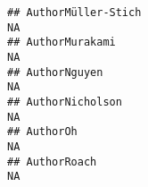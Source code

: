 \documentclass[]{article}
\begin{document}
\begin{verbatim}
## AuthorMüller-Stich                                                                                                                                                                                                                                                                                                                                                                                                                                                                    NA
## AuthorMurakami                                                                                                                                                                                                                                                                                                                                                                                                                                                                        NA
## AuthorNguyen                                                                                                                                                                                                                                                                                                                                                                                                                                                                          NA
## AuthorNicholson                                                                                                                                                                                                                                                                                                                                                                                                                                                                       NA
## AuthorOh                                                                                                                                                                                                                                                                                                                                                                                                                                                                              NA
## AuthorRoach                                                                                                                                                                                                                                                                                                                                                                                                                                                                           NA

\end{verbatim}
\end{document}
